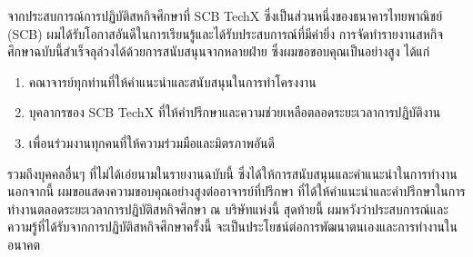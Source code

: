 \begin{acknowledgments}
    จากประสบการณ์การปฏิบัติสหกิจศึกษาที่ SCB TechX ซึ่งเป็นส่วนหนึ่งของธนาคารไทยพาณิชย์ (SCB) ผมได้รับโอกาสอันดีในการเรียนรู้และได้รับประสบการณ์ที่มีค่ายิ่ง การจัดทำรายงานสหกิจศึกษาฉบับนี้สำเร็จลุล่วงได้ด้วยการสนับสนุนจากหลายฝ่าย ซึ่งผมขอขอบคุณเป็นอย่างสูง ได้แก่
    \begin{enumerate}
        \item คณาจารย์ทุกท่านที่ให้คำแนะนำและสนับสนุนในการทำโครงงาน
        \item บุคลากรของ SCB TechX ที่ให้คำปรึกษาและความช่วยเหลือตลอดระยะเวลาการปฏิบัติงาน
        \item เพื่อนร่วมงานทุกคนที่ให้ความร่วมมือและมิตรภาพอันดี
    \end{enumerate}
    รวมถึงบุคคลอื่นๆ ที่ไม่ได้เอ่ยนามในรายงานฉบับนี้ ซึ่งได้ให้การสนับสนุนและคำแนะนำในการทำงาน นอกจากนี้ ผมขอแสดงความขอบคุณอย่างสูงต่ออาจารย์ที่ปรึกษา ที่ได้ให้คำแนะนำและคำปรึกษาในการทำงานตลอดระยะเวลาการปฏิบัติสหกิจศึกษา ณ บริษัทแห่งนี้
    สุดท้ายนี้ ผมหวังว่าประสบการณ์และความรู้ที่ได้รับจากการปฏิบัติสหกิจศึกษาครั้งนี้ จะเป็นประโยชน์ต่อการพัฒนาตนเองและการทำงานในอนาคต
\end{acknowledgments}%
\fi %

\contentspage %

\ifproject
\figurelistpage

\fi %



